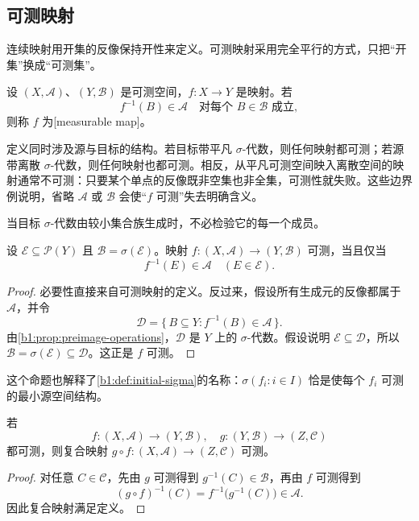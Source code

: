 \subsection{可测映射}
\label{b1:subsec:010402}

连续映射用开集的反像保持开性来定义。可测映射采用完全平行的方式，只把“开集”换成“可测集”。

\begin{definition}
\label{b1:def:measurable-map}
设 \((X,\mathcal A)\)、\((Y,\mathcal B)\) 是可测空间，\(f:X\to Y\) 是映射。若
\[
f^{-1}(B)\in\mathcal A
\quad
\text{对每个 }B\in\mathcal B\text{ 成立},
\]
则称 \(f\) 为[measurable map]。
\end{definition}

定义同时涉及源与目标的结构。若目标带平凡 \(\sigma\)-代数，则任何映射都可测；若源带离散 \(\sigma\)-代数，则任何映射也都可测。相反，从平凡可测空间映入离散空间的映射通常不可测：只要某个单点的反像既非空集也非全集，可测性就失败。这些边界例说明，省略 \(\mathcal A\) 或 \(\mathcal B\) 会使“\(f\) 可测”失去明确含义。

\ProseParagraphBreak

当目标 \(\sigma\)-代数由较小集合族生成时，不必检验它的每一个成员。

\begin{proposition}
\label{b1:prop:measurable-generator-test}
设 \(\mathcal E\subseteq\mathcal P(Y)\) 且 \(\mathcal B=\sigma(\mathcal E)\)。映射
\(
f:(X,\mathcal A)\to(Y,\mathcal B)
\)
可测，当且仅当
\[
f^{-1}(E)\in\mathcal A
\quad(E\in\mathcal E).
\]
\end{proposition}
\begin{proof}
必要性直接来自可测映射的定义。反过来，假设所有生成元的反像都属于 \(\mathcal A\)，并令
\[
\mathcal D
=\{\,B\subseteq Y:f^{-1}(B)\in\mathcal A\,\}.
\]
由\cref{b1:prop:preimage-operations}，\(\mathcal D\) 是 \(Y\) 上的 \(\sigma\)-代数。假设说明 \(\mathcal E\subseteq\mathcal D\)，所以
\(
\mathcal B=\sigma(\mathcal E)\subseteq\mathcal D
\)。这正是 \(f\) 可测。
\end{proof}

这个命题也解释了\cref{b1:def:initial-sigma}的名称：\(\sigma(f_i:i\in I)\) 恰是使每个 \(f_i\) 可测的最小源空间结构。

\begin{proposition}
\label{b1:prop:composition-measurable}
若
\[
f:(X,\mathcal A)\longrightarrow(Y,\mathcal B),
\quad
g:(Y,\mathcal B)\longrightarrow(Z,\mathcal C)
\]
都可测，则复合映射 \(g\circ f:(X,\mathcal A)\to(Z,\mathcal C)\) 可测。
\end{proposition}
\begin{proof}
对任意 \(C\in\mathcal C\)，先由 \(g\) 可测得到 \(g^{-1}(C)\in\mathcal B\)，再由 \(f\) 可测得到
\[
(g\circ f)^{-1}(C)
=f^{-1}\bigl(g^{-1}(C)\bigr)
\in\mathcal A.
\]
因此复合映射满足定义。
\end{proof}

